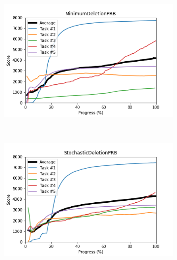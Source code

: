 \documentclass{article} %
\begin{document}
\begin{figure}[!ht]
    \begin{subfigure}[t]{0.5\textwidth}
        \centering
        \includegraphics[width=\textwidth]{images/MinimumDeletionPRB.png}
    \end{subfigure}%
    ~
    \begin{subfigure}[t]{0.5\textwidth}
        \centering
        \includegraphics[width=\textwidth]{images/StochasticDeletionPRB.png}
    \end{subfigure}%
    

\end{figure}
\end{document}
